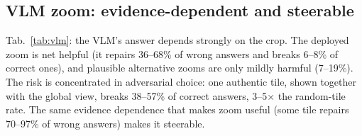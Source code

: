 \documentclass[10pt,twocolumn,letterpaper]{article}
\begin{document}
\subsection{VLM zoom: evidence-dependent and steerable}
\begin{table}[t]\centering\small
\caption{\textbf{VLM zoom transitions} relative to the global-view answer (95\% bootstrap CI). Adversarial = best-of all grid tiles (white-box option scores); realized = the model's own grounding zoom.}\label{tab:vlm}
\setlength{\tabcolsep}{2.5pt}
\end{table}

Tab.~\ref{tab:vlm}: the VLM's answer depends strongly on the crop. The deployed zoom is net helpful (it repairs 36--68\% of wrong answers and breaks 6--8\% of correct ones), and plausible alternative zooms are only mildly harmful (7--19\%). The risk is concentrated in adversarial choice: one authentic tile, shown together with the global view, breaks 38--57\% of correct answers, 3--5$\times$ the random-tile rate. The same evidence dependence that makes zoom useful (some tile repairs 70--97\% of wrong answers) makes it steerable.
\end{document}

